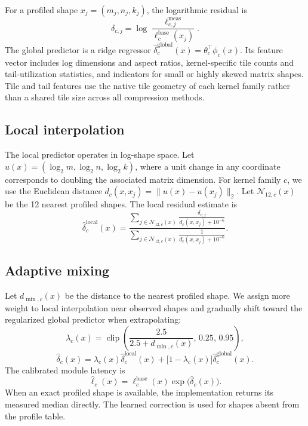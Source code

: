 \documentclass[letterpaper]{article} %
\numberwithin{equation}{section}
\numberwithin{table}{section}
\begin{document}
For a profiled shape \(x_j=(m_j,n_j,k_j)\), the logarithmic residual is
\begin{equation}
\delta_{c,j}
=
\log\frac{\ell^{\mathrm{meas}}_{c,j}}
{\ell_c^{\mathrm{base}}(x_j)}.
\end{equation}
The global predictor is a ridge regressor
\(\widehat{\delta}^{\mathrm{global}}_c(x)=\theta_c^\top\phi_c(x)\).
Its feature vector includes log dimensions and aspect ratios, kernel-specific
tile counts and tail-utilization statistics, and indicators for small or
highly skewed matrix shapes.
Tile and tail features use the native tile geometry of each kernel family
rather than a shared tile size across all compression methods.

\subsection{Local interpolation}

The local predictor operates in log-shape space. Let
\(u(x)=(\log_2m,\log_2n,\log_2k)\), where a unit change in any coordinate
corresponds to doubling the associated matrix dimension. For kernel family
\(c\), we use the Euclidean distance
\(d_c(x,x_j)=\|u(x)-u(x_j)\|_2\). Let
\(\mathcal{N}_{12,c}(x)\) be the 12 nearest profiled shapes. The local
residual estimate is
\begin{equation}
\widehat{\delta}^{\mathrm{local}}_c(x)
=
\frac{
\displaystyle\sum_{j\in\mathcal{N}_{12,c}(x)}
\frac{\delta_{c,j}}{d_c(x,x_j)+10^{-6}}
}{
\displaystyle\sum_{j\in\mathcal{N}_{12,c}(x)}
\frac{1}{d_c(x,x_j)+10^{-6}}
}.
\end{equation}

\subsection{Adaptive mixing}

Let \(d_{\min,c}(x)\) be the distance to the nearest profiled shape. We assign
more weight to local interpolation near observed shapes and gradually shift
toward the regularized global predictor when extrapolating:
\begin{equation}
\lambda_c(x)
=
\operatorname{clip}\!\left(
\frac{2.5}{2.5+d_{\min,c}(x)},\,0.25,\,0.95
\right),
\end{equation}
\begin{equation}
\widehat{\delta}_c(x)
=
\lambda_c(x)\widehat{\delta}^{\mathrm{local}}_c(x)
+\bigl[1-\lambda_c(x)\bigr]
\widehat{\delta}^{\mathrm{global}}_c(x).
\end{equation}
The calibrated module latency is
\begin{equation}
\widehat{\ell}_c(x)
=
\ell_c^{\mathrm{base}}(x)\exp\!\bigl(\widehat{\delta}_c(x)\bigr).
\end{equation}
When an exact profiled shape is available, the implementation returns its
measured median directly. The learned correction is used for shapes absent
from the profile table.
\end{document}
